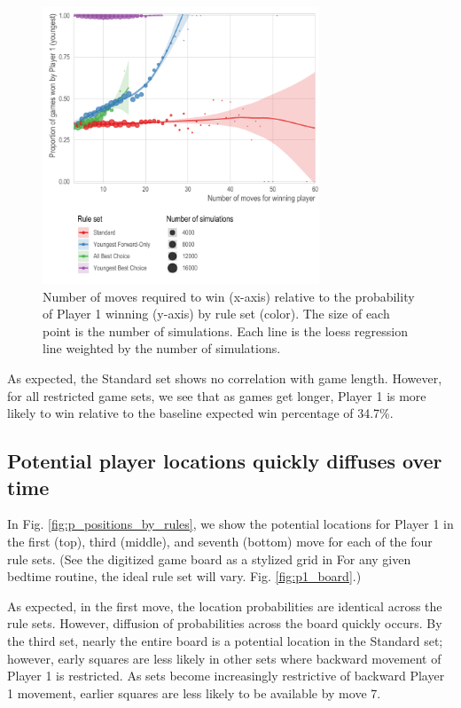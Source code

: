 \documentclass[letterpaper,9pt,twocolumn,twoside,]{pinp}
\begin{document}
\begin{figure}
  \begin{center}
    \includegraphics[width=3.25in]{./../../plots/p_wins_vs_moves.pdf}
    \caption{Number of moves required to win (x-axis) relative to the probability of Player 1 winning (y-axis) by rule set (color). The size of each point is the number of simulations. Each line is the loess regression line weighted by the number of simulations.}
    \label{fig:p_wins_vs_moves}
  \end{center}
\end{figure}

As expected, the Standard set shows no correlation with game length.
However, for all restricted game sets, we see that as games get longer,
Player 1 is more likely to win relative to the baseline expected win
percentage of 34.7\%.

\hypertarget{potential-player-locations-quickly-diffuses-over-time}{%
\subsection{Potential player locations quickly diffuses over
time}\label{potential-player-locations-quickly-diffuses-over-time}}

In Fig. \ref{fig:p_positions_by_rules}, we show the potential locations
for Player 1 in the first (top), third (middle), and seventh (bottom)
move for each of the four rule sets. (See the digitized game board as a
stylized grid in For any given bedtime routine, the ideal rule set will
vary. Fig. \ref{fig:p1_board}.)

As expected, in the first move, the location probabilities are identical
across the rule sets. However, diffusion of probabilities across the
board quickly occurs. By the third set, nearly the entire board is a
potential location in the Standard set; however, early squares are less
likely in other sets where backward movement of Player 1 is restricted.
As sets become increasingly restrictive of backward Player 1 movement,
earlier squares are less likely to be available by move 7.
\end{document}
